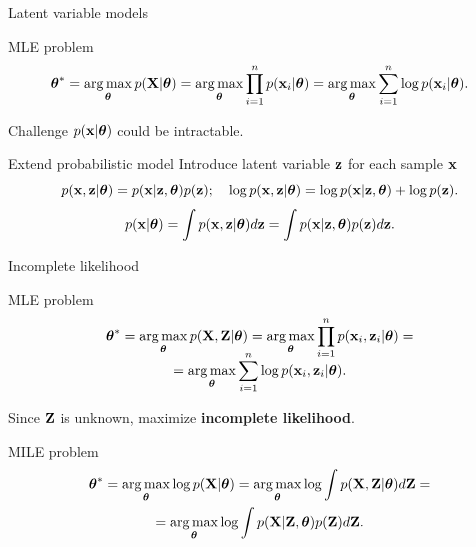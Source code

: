 \begin{frame}{Latent variable models}
	\begin{block}{MLE problem}
		\vspace{-0.3cm}
		\[
		\boldsymbol{\theta}^* = \operatorname*{arg\,max}_{\boldsymbol{\theta}} p(\mathbf{X} | \boldsymbol{\theta}) = \operatorname*{arg\,max}_{\boldsymbol{\theta}} \prod_{i=1}^n p(\mathbf{x}_i | \boldsymbol{\theta}) = \operatorname*{arg\,max}_{\boldsymbol{\theta}} \sum_{i=1}^n \log p(\mathbf{x}_i | \boldsymbol{\theta}).
		\]
		\vspace{-0.3cm}
	\end{block}
	\begin{block}{Challenge}
		$p(\mathbf{x} | \boldsymbol{\theta})$ could be intractable.
	\end{block}
	\begin{block}{Extend probabilistic model}
		Introduce latent variable $\mathbf{z}$ for each sample $\mathbf{x}$
		\[
		p(\mathbf{x}, \mathbf{z} | \boldsymbol{\theta}) = p(\mathbf{x} | \mathbf{z}, \boldsymbol{\theta}) p(\mathbf{z}); \quad 
		\log p(\mathbf{x}, \mathbf{z} | \boldsymbol{\theta}) = \log p(\mathbf{x} | \mathbf{z}, \boldsymbol{\theta}) + \log p(\mathbf{z}).
		\]
		\[
		p(\mathbf{x} | \boldsymbol{\theta}) = \int p(\mathbf{x}, \mathbf{z} | \boldsymbol{\theta}) d\mathbf{z} = \int p(\mathbf{x} | \mathbf{z}, \boldsymbol{\theta}) p(\mathbf{z}) d\mathbf{z}.
		\]
	\end{block}
\end{frame}
\begin{frame}{Incomplete likelihood}
\begin{block}{MLE problem}
	\vspace{-0.3cm}
	\begin{multline*}
		\vspace{-0.3cm}
		\btheta^* = \argmax_{\btheta} p(\bX, \bZ | \btheta) = \argmax_{\btheta} \prod_{i=1}^n p(\bx_i, \bz_i | \btheta) = \\ = \argmax_{\btheta} \sum_{i=1}^n \log p(\bx_i, \bz_i | \btheta).
	\end{multline*}
	\vspace{-0.3cm}
\end{block}
Since $\mathbf{Z}$ is unknown, maximize \textbf{incomplete likelihood}.
\begin{block}{MILE problem}
	\vspace{-0.3cm}
	\begin{multline*}
		\boldsymbol{\theta}^* = \operatorname*{arg\,max}_{\boldsymbol{\theta}} \log p(\mathbf{X}| \boldsymbol{\theta}) = \operatorname*{arg\,max}_{\boldsymbol{\theta}} \log \int p(\mathbf{X}, \mathbf{Z} | \boldsymbol{\theta}) d \mathbf{Z} = \\ = \operatorname*{arg\,max}_{\boldsymbol{\theta}} \log \int p(\mathbf{X}| \mathbf{Z}, \boldsymbol{\theta}) p(\mathbf{Z}) d\mathbf{Z}.
	\end{multline*}
	\vspace{-0.3cm}
\end{block}

\end{frame}
